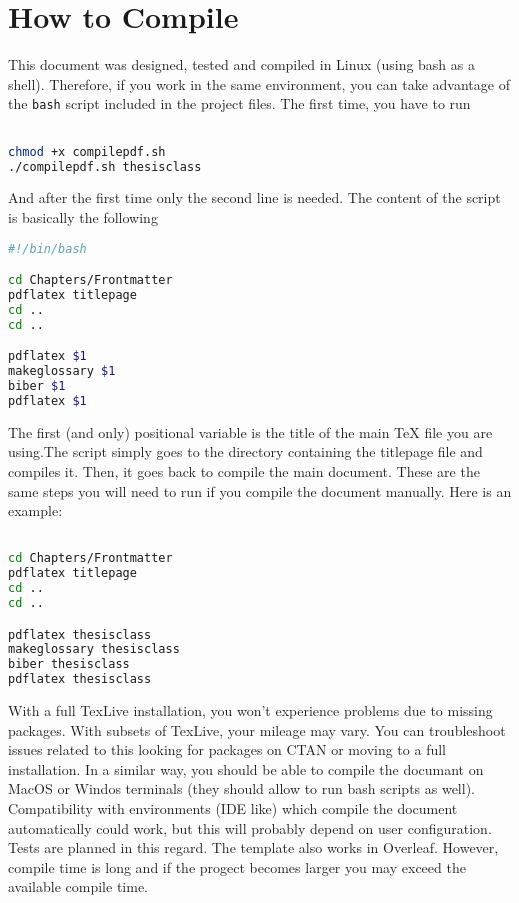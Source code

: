 \section{How to Compile}

This document was designed, tested and compiled in Linux (using bash as a shell). Therefore, if you work in the same environment, you can take advantage of the \texttt{bash} script included in the project files. The first time, you have to run

\begin{lstlisting}[language=bash,caption={bash version}]

chmod +x compilepdf.sh
./compilepdf.sh thesisclass

\end{lstlisting}

And after the first time only the second line is needed. The content of the script is basically the following

\begin{lstlisting}[language=bash,caption={bash version}]
#!/bin/bash  

cd Chapters/Frontmatter
pdflatex titlepage
cd ..
cd ..

pdflatex $1 
makeglossary $1 
biber $1
pdflatex $1 

\end{lstlisting}

The first (and only) positional variable is the title of the main \TeX\hspace{2pt} file you are using.The script simply goes to the directory containing the titlepage file and compiles it. Then, it goes back to compile the main document. These are the same steps you will need to run if you compile the document manually. Here is an example:

\begin{lstlisting}[language=bash,caption={bash version}]

cd Chapters/Frontmatter
pdflatex titlepage
cd ..
cd ..

pdflatex thesisclass
makeglossary thesisclass 
biber thesisclass
pdflatex thesisclass 

\end{lstlisting}
  

With a full TexLive installation, you won't experience problems due to missing packages. With subsets of TexLive, your mileage may vary. You can troubleshoot issues related to this looking for packages on CTAN or moving to a full installation. In a similar way, you should be able to compile the documant on MacOS or Windos terminals (they should allow to run bash scripts as well). Compatibility with environments (IDE like) which compile the document automatically could work, but this will probably depend on user configuration. Tests are planned in this regard. The template also works in Overleaf. However, compile time is long and if the progect becomes larger you may exceed the available compile time. 

